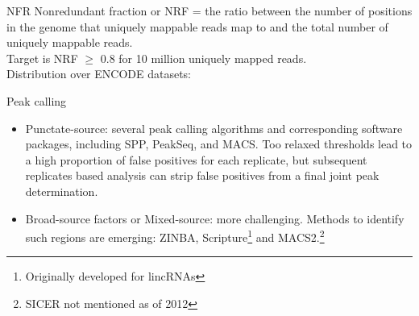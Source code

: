 \documentclass{beamer}
\begin{document}
\begin{frame}{NFR}
Nonredundant fraction or NRF = the ratio between the number of positions in the genome that uniquely mappable reads map to and the total number of uniquely mappable reads. \\
Target is NRF $\geq$ 0.8 for 10 million uniquely mapped reads.\\
Distribution over ENCODE datasets:\\
\end{frame}

\begin{frame}{Peak calling}
\begin{itemize}
\item Punctate-source: several peak calling algorithms and corresponding software packages, including SPP, PeakSeq, and MACS. Too relaxed thresholds lead to a high proportion of false positives for each replicate, but subsequent replicates based analysis can strip false positives from a final joint peak determination.
\item Broad-source factors or Mixed-source: more challenging. Methods to identify such regions are emerging: ZINBA, Scripture\footnote{Originally developed for lincRNAs} and MACS2.\footnote{SICER not mentioned as of 2012}
\end{itemize}
\end{frame}
\end{document}
